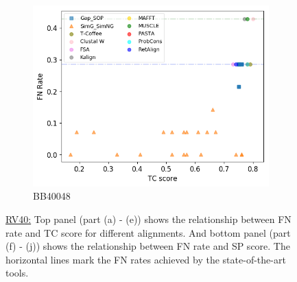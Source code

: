 \begin{figure}[!htbp]
\begin{adjustwidth}{-1cm}{-1cm}
\begin{subfigure}{0.22\textwidth}
			\includegraphics[width=\columnwidth]{Figure/summary/precomputedInit/Balibase/BB40048_fnrate_vs_tc_2}
			\caption{BB40048}
		\end{subfigure}
		\caption{\underline{RV40:} Top panel (part (a) - (e)) shows the relationship between FN rate and TC score for different alignments. And bottom panel (part (f) - (j)) shows the relationship between FN rate and SP score. The horizontal lines mark the FN rates achieved by the state-of-the-art tools.}
		\label{fig:rv40_fnrate_vs_tc}
	\end{adjustwidth}
\end{figure}
